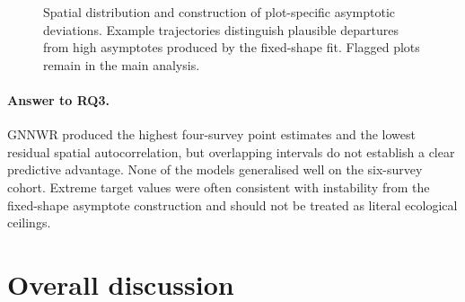 \begin{figure}[!htbp]
\centering
{}
\caption{Spatial distribution and construction of plot-specific asymptotic deviations. Example
trajectories distinguish plausible departures from high asymptotes produced by the fixed-shape
fit. Flagged plots remain in the main analysis.}
\label{fig:rq3-deviation-examples}
\end{figure}


\paragraph*{Answer to RQ3.}
GNNWR produced the highest four-survey point estimates and the lowest residual spatial
autocorrelation, but overlapping intervals do not establish a clear predictive advantage. None of
the models generalised well on the six-survey cohort. Extreme target values were often consistent
with instability from the fixed-shape asymptote construction and should not be treated as literal
ecological ceilings.


\section{Overall discussion}
\label{sec:results-overall-discussion}

